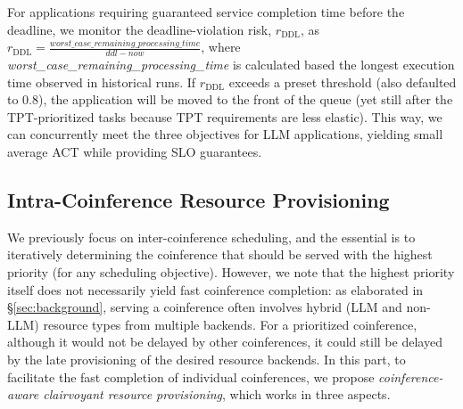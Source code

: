 For applications requiring guaranteed service completion time before the deadline, we monitor the deadline-violation risk, $r_\text{DDL}$, as
$r_\text{DDL} = \frac{worst\_case\_remaining\_processing\_time}{ddl - now}$,
where \emph{worst\_case\_remaining\_processing\_time} is calculated based the longest execution time observed in historical runs.
If $r_\text{DDL}$ exceeds a preset threshold (also defaulted to 0.8), the application will be moved to the front of the queue (yet still after the TPT-prioritized tasks because TPT requirements are less elastic).
This way, we can concurrently meet the three objectives for LLM applications, yielding small average ACT while providing SLO guarantees.




    \vspace{-0.1in}
\subsection{Intra-Coinference Resource Provisioning}
\label{subsec:resource_provisioning}

We previously focus on inter-coinference scheduling, and the essential is to iteratively determining the coinference that should be served with the highest priority (for any scheduling objective). 
However, we note that the highest priority itself does not necessarily yield fast coinference completion: as elaborated in \S\ref{sec:background}, serving a coinference often involves hybrid (LLM and non-LLM) resource types from multiple backends. 
For a prioritized coinference, although it would not be delayed by other coinferences, it could still be delayed by the late provisioning of the desired resource backends. 
In this part, to facilitate the fast completion of individual coinferences, we propose \emph{coinference-aware clairvoyant resource provisioning}, 
which works in three aspects. 

